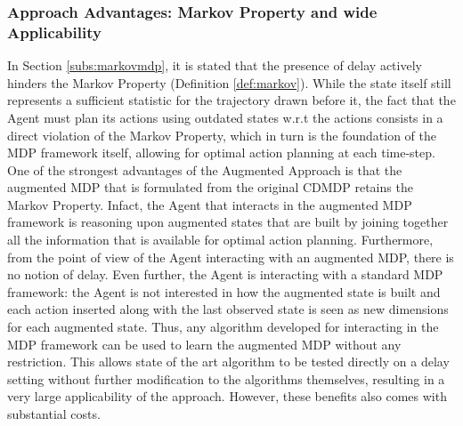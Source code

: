             \subsubsection{Approach Advantages: Markov Property and wide Applicability}
                In Section \ref{subs:markovmdp}, it is stated that the presence of delay actively hinders the Markov Property (Definition \ref{def:markov}). While the state itself still represents a sufficient statistic for the trajectory drawn before it, the fact that the Agent must plan its actions using outdated states w.r.t the actions consists in a direct violation of the Markov Property, which in turn is the foundation of the MDP framework itself, allowing for optimal action planning at each time-step. \newline
                One of the strongest advantages of the Augmented Approach is that the augmented MDP that is formulated from the original CDMDP retains the Markov Property. Infact, the Agent that interacts in the augmented MDP framework is reasoning upon augmented states that are built by joining together all the information that is available for optimal action planning. Furthermore, from the point of view of the Agent interacting with an augmented MDP, there is no notion of delay. \newline
                Even further, the Agent is interacting with a standard MDP framework: the Agent is not interested in how the augmented state is built and each action inserted along with the last observed state is seen as new dimensions for each augmented state. Thus, any algorithm developed for interacting in the MDP framework can be used to learn the augmented MDP without any restriction. This allows state of the art algorithm to be tested directly on a delay setting without further modification to the algorithms themselves, resulting in a very large applicability of the approach. However, these benefits also comes with substantial costs.
                
